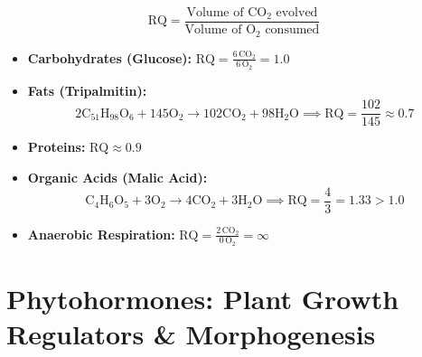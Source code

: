 \documentclass[10pt,twoside,openright]{book}
\begin{document}
\begin{formulabox}
\begin{equation}
  \mathrm{RQ} = \frac{\text{Volume of } \mathrm{CO_2} \text{ evolved}}{\text{Volume of } \mathrm{O_2} \text{ consumed}}
\end{equation}
\begin{itemize}[leftmargin=*]
  \item \textbf{Carbohydrates (Glucose):} $\mathrm{RQ} = \frac{6\,\mathrm{CO_2}}{6\,\mathrm{O_2}} = \mathbf{1.0}$
  \item \textbf{Fats (Tripalmitin):}
  \[
    2\mathrm{C_{51}H_{98}O_6} + 145\mathrm{O_2} \longrightarrow 102\mathrm{CO_2} + 98\mathrm{H_2O} \implies \mathrm{RQ} = \frac{102}{145} \approx \mathbf{0.7}
  \]
  \item \textbf{Proteins:} $\mathbf{\mathrm{RQ} \approx 0.9}$
  \item \textbf{Organic Acids (Malic Acid):}
  \[
    \mathrm{C_4H_6O_5} + 3\mathrm{O_2} \longrightarrow 4\mathrm{CO_2} + 3\mathrm{H_2O} \implies \mathrm{RQ} = \frac{4}{3} = \mathbf{1.33} > 1.0
  \]
  \item \textbf{Anaerobic Respiration:} $\mathrm{RQ} = \frac{2\,\mathrm{CO_2}}{0\,\mathrm{O_2}} = \mathbf{\infty}$
\end{itemize}
\end{formulabox}

\section{Phytohormones: Plant Growth Regulators \& Morphogenesis}
\end{document}
